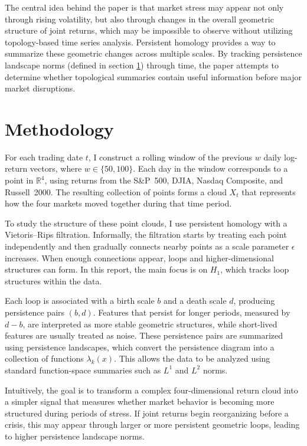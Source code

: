 \documentclass{article}
\begin{document}
The central idea behind the paper is that market stress may appear not only through rising volatility, but also through changes in the overall geometric structure of joint returns, which may be impossible to observe without utilizing topology-based time series analysis. Persistent homology provides a way to summarize these geometric changes across multiple scales. By tracking persistence landscape norms (defined in section \ref{sec:methods}) through time, the paper attempts to determine whether topological summaries contain useful information before major market disruptions.

\newpage
\section{Methodology}
\label{sec:methods}

For each trading date $t$, I construct a rolling window of the previous $w$ daily log-return vectors, where $w\in\{50,100\}$. Each day in the window corresponds to a point in $\mathbb{R}^4$, using returns from the S\&P~500, DJIA, Nasdaq Composite, and Russell~2000. The resulting collection of points forms a cloud $X_t$ that represents how the four markets moved together during that time period.

To study the structure of these point clouds, I use persistent homology with a Vietoris--Rips filtration. Informally, the filtration starts by treating each point independently and then gradually connects nearby points as a scale parameter $\epsilon$ increases. When enough connections appear, loops and higher-dimensional structures can form. In this report, the main focus is on $H_1$, which tracks loop structures within the data.

Each loop is associated with a birth scale $b$ and a death scale $d$, producing persistence pairs $(b,d)$. Features that persist for longer periods, measured by $d-b$, are interpreted as more stable geometric structures, while short-lived features are usually treated as noise. These persistence pairs are summarized using persistence landscapes, which convert the persistence diagram into a collection of functions $\lambda_k(x)$. This allows the data to be analyzed using standard function-space summaries such as $L^1$ and $L^2$ norms.

Intuitively, the goal is to transform a complex four-dimensional return cloud into a simpler signal that measures whether market behavior is becoming more structured during periods of stress. If joint returns begin reorganizing before a crisis, this may appear through larger or more persistent geometric loops, leading to higher persistence landscape norms.
\end{document}
